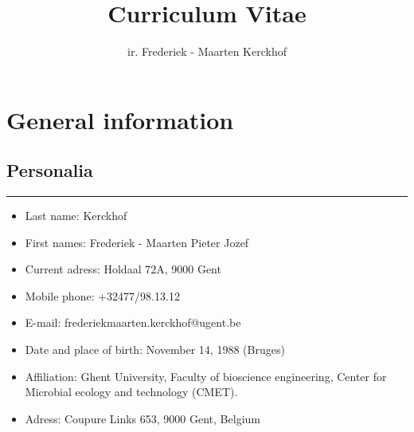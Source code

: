 \documentclass[a4paper,11pt,oneside]{article}
\title{Curriculum Vitae}
\author{ir. Frederiek - Maarten Kerckhof}
\begin{document}
\maketitle

\section*{General information}
\subsection*{Personalia}
\rule{\textwidth}{1pt}
\begin{itemize}
  \item Last name: Kerckhof
  \item First names: Frederiek - Maarten Pieter Jozef
  \item Current adress: Holdaal 72A, 9000 Gent
  \item Mobile phone: +32477/98.13.12
  \item E-mail: frederiekmaarten.kerckhof@ugent.be
  \item Date and place of birth: November 14, 1988 (Bruges)
  \item Affiliation: Ghent University, Faculty of bioscience engineering, Center for Microbial ecology and technology (CMET).
  \item Adress: Coupure Links 653, 9000 Gent, Belgium
\end{itemize}
\end{document}
